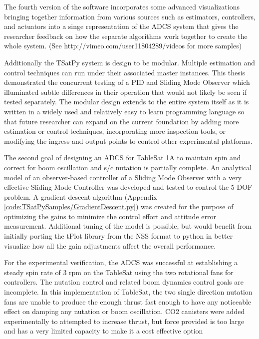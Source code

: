 The fourth version of the software incorporates some advanced visualizations bringing together information from various sources such as estimators, controllers, and actuators into a singe representation of the ADCS system that gives the researcher feedback on how the separate algorithms work together to create the whole system. (See http://vimeo.com/user11804289/videos for more samples)

Additionally the TSatPy system is design to be modular.  Multiple estimation and control techniques can run under their associated master instances.  This thesis demonstrated the concurrent testing of a PID and Sliding Mode Observer which illuminated subtle differences in their operation that would not likely be seen if tested separately.  The modular design extends to the entire system itself as it is written in a widely used and relatively easy to learn programming language so that future researcher can expand on the current foundation by adding more estimation or control techniques, incorporating more inspection tools, or modifying the ingress and output points to control other experimental platforms.

The second goal of designing an ADCS for TableSat 1A to maintain spin and correct for boom oscillation and s/c nutation is partially complete.  An analytical model of an observer-based controller of a Sliding Mode Observer with a very effective Sliding Mode Controller was developed and tested to control the 5-DOF problem.  A gradient descent algorithm (Appendix \ref{code:TSatPySamples/GradientDescent.py}) was created for the purpose of optimizing the gains to minimize the control effort and attitude error measurement.   Additional tuning of the model is possible, but would benefit from initially porting the tPlot library from the NSS format to python in better visualize how all the gain adjustments affect the overall performance.

For the experimental verification, the ADCS was successful at establishing a steady spin rate of 3 rpm on the TableSat using the two rotational fans for controllers.  The nutation control and related boom dynamics control goals are incomplete.  In this implementation of TableSat, the two single direction nutation fans are unable to produce the enough thrust fast enough to have any noticeable effect on damping any nutation or boom oscillation.  CO2 canisters were added experimentally to attempted to increase thrust, but force provided is too large and has a very limited capacity to make it a cost effective option

